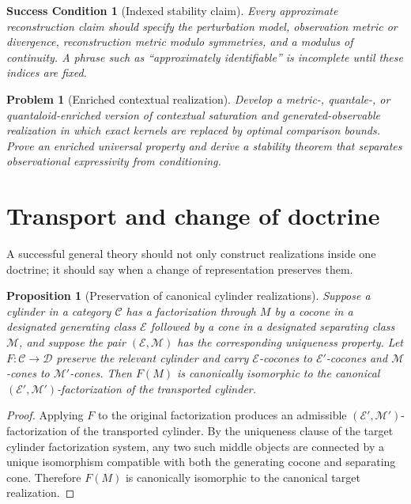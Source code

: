 \documentclass[11pt]{article}
\newtheorem{proposition}[theorem]{Proposition}
\newtheorem{condition}[theorem]{Success Condition}
\newtheorem{problem}[theorem]{Problem}
\theoremstyle{definition}
\theoremstyle{remark}
\begin{document}
\begin{condition}[Indexed stability claim]
Every approximate reconstruction claim should specify the perturbation model, observation metric or divergence, reconstruction metric modulo symmetries, and a modulus of continuity. A phrase such as ``approximately identifiable'' is incomplete until these indices are fixed.
\end{condition}

\begin{problem}[Enriched contextual realization]
Develop a metric-, quantale-, or quantaloid-enriched version of contextual saturation and generated-observable realization in which exact kernels are replaced by optimal comparison bounds. Prove an enriched universal property and derive a stability theorem that separates observational expressivity from conditioning.
\end{problem}

\section{Transport and change of doctrine}

A successful general theory should not only construct realizations inside one doctrine; it should say when a change of representation preserves them.

\begin{proposition}[Preservation of canonical cylinder realizations]
Suppose a cylinder in a category $\mathcal C$ has a factorization through $M$ by a cocone in a designated generating class $\mathcal E$ followed by a cone in a designated separating class $\mathcal M$, and suppose the pair $(\mathcal E,\mathcal M)$ has the corresponding uniqueness property. Let $F:\mathcal C\to\mathcal D$ preserve the relevant cylinder and carry $\mathcal E$-cocones to $\mathcal E'$-cocones and $\mathcal M$-cones to $\mathcal M'$-cones. Then $F(M)$ is canonically isomorphic to the canonical $(\mathcal E',\mathcal M')$-factorization of the transported cylinder.
\end{proposition}

\begin{proof}
Applying $F$ to the original factorization produces an admissible $(\mathcal E',\mathcal M')$-factorization of the transported cylinder. By the uniqueness clause of the target cylinder factorization system, any two such middle objects are connected by a unique isomorphism compatible with both the generating cocone and separating cone. Therefore $F(M)$ is canonically isomorphic to the canonical target realization.
\end{proof}
\end{document}
